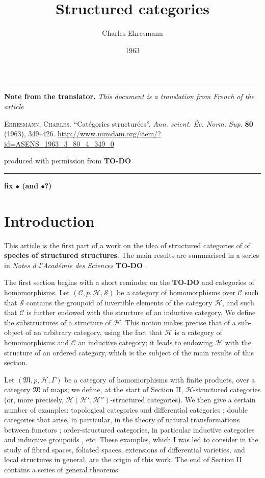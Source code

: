 \documentclass{article}
\title{Structured categories}
\author{Charles Ehresmann}
\date{1963}
\newcommand{\origcit}{%
  \textsc{Ehresmann, Charles.}
  ``Catégories structurées''.
  \emph{Ann. scient. Éc. Norm. Sup.} \textbf{80} (1963), 349--426.
  \url{http://www.numdam.org/item/?id=ASENS_1963_3_80_4_349_0}
}
\newenvironment{itenv}[1]
  {\phantomsection\par\medskip\noindent\textbf{#1.}\itshape}
  {\par\medskip}
\newcommand{\oldpage}[1]{\marginpar{\footnotesize$\Big\vert$ \textit{p.~#1}}}
\newcommand{\todo}{{\color{purple}\textbf{TO-DO }}}
\newcommand{\unsure}[1]{{\color{purple}\textbf{#1}}}
\newcommand{\CC}{\mathcal{C}}
\newcommand{\HH}{\mathcal{H}}
\renewcommand{\SS}{\mathcal{S}}
\newcommand{\MM}{\mathfrak{M}}
\newcommand{\dotc}{{\mathbin{\bullet}}}
\begin{document}
\maketitle

\hrule
\begin{itenv}{Note from the translator}
This document is a translation from French of the article

\medskip
{\normalfont\origcit}

\medskip
produced with permission from \todo
\end{itenv}
\hrule

\tableofcontents


\unsure{fix $\dotc$ (and $\dotc$?)}

\section*{Introduction}

\oldpage{349}

This article is the first part of a work on the idea of structured categories of of \unsure{species of structured structures}.
The main results are summarised in a series in \emph{Notes à l'Académie des Sciences} \cite{3e}\todo.

The first section begins with a short reminder on the \todo and categories of homomorphisms.
Let $(\CC,p,\HH,\SS)$ be a category of homomorphisms over $\CC$ such that $\SS$ contains the groupoid of invertible elements of the category $\HH$, and such that $\CC$ is further endowed with the structure of an inductive category.
We define the substructures of a structure of $\HH$.
This notion makes precise that of a sub-object of an arbitrary category, using the fact that $\HH$ is a category of homomorphisms and $\CC$ an inductive category;
it leads to endowing $\HH$ with the structure of an ordered category, which is the subject of the main results of this section.

Let $(\MM,p,\HH,\Gamma)$ be a category of homomorphisms with finite products, over a category $\MM$ of maps;
we define, at the start of Section II, $\HH$-structured categories (or, more precisely, $\HH(\HH',\HH'')$-structured categories).
We then give a certain number of examples: topological categories and differential categories \cite{3b}; double categories that arise, in particular, in the theory of natural transformations between functors \cite{3d}; order-structured categories, in particular inductive categories and inductive groupoids \cite{3c}, etc.
\oldpage{350}
These examples, which I was led to consider in the study of fibred spaces, foliated spaces, extensions of differential varieties, and local structures in general, are the origin of this work.
The end of Section II contains a series of general theorems:
\end{document}
